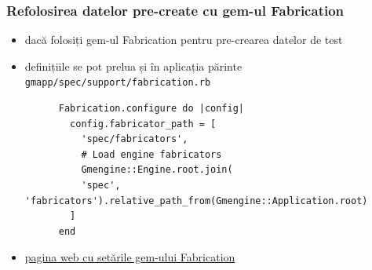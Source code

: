 \documentclass[compress]{beamer}
\begin{document}
\begin{frame}[fragile]
\frametitle{Refolosirea datelor pre-create cu gem-ul Fabrication}
\begin{itemize}
  \item dacă folosiți gem-ul Fabrication pentru pre-crearea datelor de test
  \item definițiile se pot prelua și în aplicația părinte
    \texttt{gmapp/spec/support/fabrication.rb}
    \begin{verbatim}
      Fabrication.configure do |config|
        config.fabricator_path = [
          'spec/fabricators',
          # Load engine fabricators
          Gmengine::Engine.root.join(
          'spec', 'fabricators').relative_path_from(Gmengine::Application.root)
        ]
      end
    \end{verbatim}
  \item \href{http://www.fabricationgem.org/#!configuration}{pagina web cu setările gem-ului Fabrication}
\end{itemize}
\end{frame}
\end{document}

